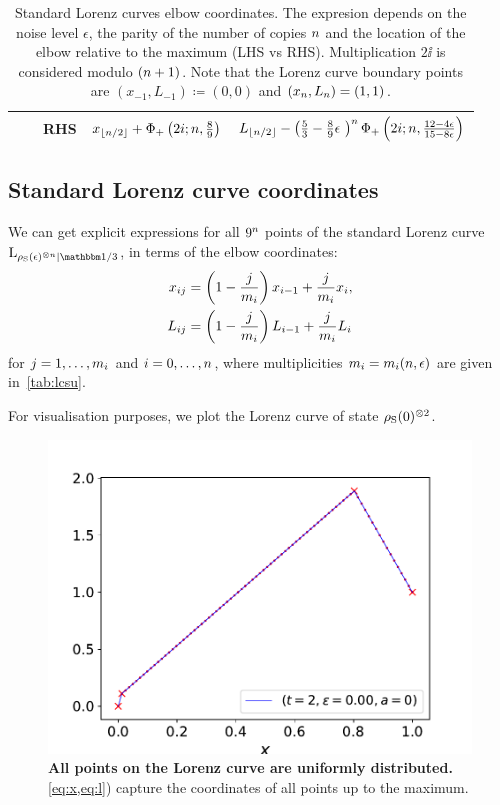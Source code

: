 \begin{table}[h]
\begin{tabular}{c|c|c|r|r}
    & & RHS & $x_{\lfloor n/2 \rfloor} + \Phi_+\left(2i;n,\frac{8}{9}\right)$ & $L_{\lfloor \NN/2 \rfloor} - \left( \frac{5}{3} - \frac{8}{9}\epsilon\ \right)^\NN\Phi_+\left(2\ii;\NN,\frac{12-4\epsilon}{15-8\epsilon}\right)$ \\ \hline
  \end{tabular}
  \caption{Standard Lorenz curves elbow coordinates.
  The expresion depends on the noise level $\epsilon$, the parity of the number of copies $n$ and the location of the elbow relative to the maximum (LHS vs RHS).
  Multiplication $2\ii$ is considered modulo $(n+1)$.
  Note that the Lorenz curve boundary points are $(x_{-1}, L_{-1}) \coloneqq (0,0)$ and $(x_{n}, L_{n}) = (1,1)$.
  }
  \label{tab:lcsu_coord_elb_app}
\end{table}

\subsection{Standard Lorenz curve coordinates}\label{app:lcsu_coord}
We can get explicit expressions for all $9^{n}$ points of the standard Lorenz curve $\lc{\noisysN}{\id/3}$, in terms of the elbow coordinates:
\begin{align}
    x_{ij} &= \left( 1-\frac{j}{m_{i}} \right) x_{i-1} + \frac{j}{m_{i}} x_{i}, \label{eq:x}\\
    L_{ij} &= \left( 1-\frac{j}{m_{i}} \right) L_{i-1} + \frac{j}{m_{i}} L_{i} \label{eq:l}
\end{align}
for $j = 1,\dots,m_{i}$ and $i=0,\dots,n$, where multiplicities $m_i = m_i(n, \epsilon)$ are given in~\cref{tab:lcsu}.

For visualisation purposes, we plot the Lorenz curve of state $\rho_{\rm{S}}(0)^{\otimes 2}$.
\begin{figure}[t]
    \centering
    \includegraphics[scale=0.6]{figs/lcpoints.pdf}
    \caption{\textbf{All points on the Lorenz curve are uniformly distributed.}
    \cref{eq:x,eq:l}) capture the coordinates of all points up to the maximum.
    }
    \label{fig:lc}
\end{figure}


